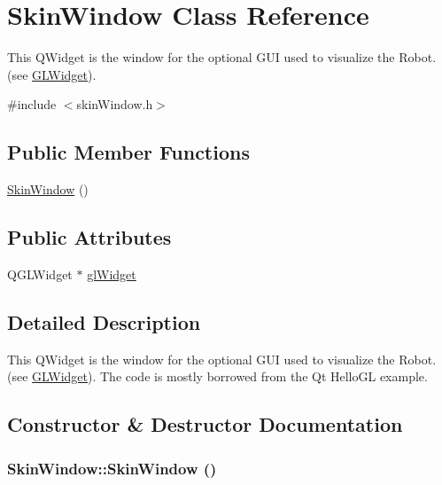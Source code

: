\hypertarget{class_skin_window}{
\section{SkinWindow Class Reference}
\label{class_skin_window}
}


This QWidget is the window for the optional GUI used to visualize the Robot. (see \hyperlink{class_g_l_widget}{GLWidget}).  


{\ttfamily \#include $<$skinWindow.h$>$}\subsection*{Public Member Functions}
\begin{DoxyCompactItemize}
\item 
\hyperlink{class_skin_window_a7b0c7acdb8f91d4cd84f7f5ca23b1d78}{SkinWindow} ()
\end{DoxyCompactItemize}
\subsection*{Public Attributes}
\begin{DoxyCompactItemize}
\item 
QGLWidget $\ast$ \hyperlink{class_skin_window_adc8cd91eda08e26104717957c37bccc0}{glWidget}
\end{DoxyCompactItemize}


\subsection{Detailed Description}
This QWidget is the window for the optional GUI used to visualize the Robot. (see \hyperlink{class_g_l_widget}{GLWidget}). The code is mostly borrowed from the Qt HelloGL example. 

\subsection{Constructor \& Destructor Documentation}
\hypertarget{class_skin_window_a7b0c7acdb8f91d4cd84f7f5ca23b1d78}{
\subsubsection[{SkinWindow}]{\setlength{\rightskip}{0pt plus 5cm}SkinWindow::SkinWindow ()}}
\label{class_skin_window_a7b0c7acdb8f91d4cd84f7f5ca23b1d78}


